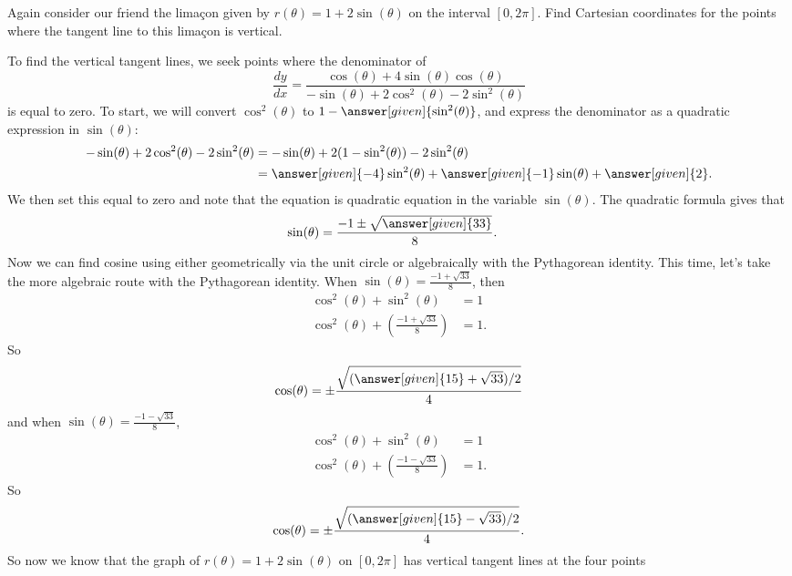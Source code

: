 \documentclass{ximera}
\begin{document}
\begin{example}
  Again consider our friend the lima\c{c}on given by $r(\theta)
  =1+2\sin(\theta)$ on the interval $[0,2\pi]$.  Find Cartesian
  coordinates for the points where the tangent line to this lima\c{c}on
  is vertical.
  \begin{explanation}
    To find the vertical tangent lines, we seek points where the
    denominator of
    \[
    \frac{dy}{dx}=\frac{\cos(\theta) + 4\sin(\theta)\cos(\theta)}{-\sin(\theta) + 2\cos^2(\theta)-2\sin^2(\theta)}
    \]
    is equal to zero.  To start, we will convert $\cos^2(\theta)$ to
    $1-\answer[given]{\sin^2(\theta)}$, and express the denominator as a quadratic
    expression in $\sin(\theta)$:
  \begin{align*}
    -\sin(\theta) + 2\cos^2(\theta)-2\sin^2(\theta) & = -\sin(\theta) + 2(1-\sin^2(\theta))-2\sin^2(\theta) \\
    &= \answer[given]{-4} \sin^2(\theta) + \answer[given]{-1}\sin(\theta) + \answer[given]{2}.
  \end{align*}
  We then set this equal to zero and note that the equation is quadratic equation in the variable $\sin(\theta)$. The quadratic formula gives that 
  \begin{align*}
    \sin(\theta) &= \frac{-1\pm\sqrt{\answer[given]{33}}}{8}.
  \end{align*}
  Now we can find cosine using either geometrically via the unit circle or algebraically with the Pythagorean
  identity.  This time, let's take the more algebraic route with the Pythagorean identity. When $\sin(\theta) =\frac{-1+\sqrt{33}}{8}$, then
  \begin{align*}
    \cos^2(\theta) + \sin^2(\theta) &= 1\\
    \cos^2(\theta) + \left(\frac{-1+\sqrt{33}}{8}\right) &= 1.
  \end{align*}
  So
  \[
  \cos(\theta) = \pm \frac{\sqrt{(\answer[given]{15}+\sqrt{33})/2}}{4}
  \]
  and when $\sin(\theta) =\frac{-1-\sqrt{33}}{8}$,
  \begin{align*}
    \cos^2(\theta) + \sin^2(\theta) &= 1\\
    \cos^2(\theta) + \left(\frac{-1-\sqrt{33}}{8}\right) &= 1.
  \end{align*}
  So
  \[
  \cos(\theta) = \pm \frac{\sqrt{(\answer[given]{15}-\sqrt{33})/2}}{4}.
  \]
  So now we know that the graph of $r(\theta) =1+2\sin(\theta)$ on
  $[0,2\pi]$ has vertical tangent lines at the four points
   \begin{image}
      \begin{tikzpicture}

\end{tikzpicture}
\end{image}
\end{explanation}
\end{example}
\end{document}
